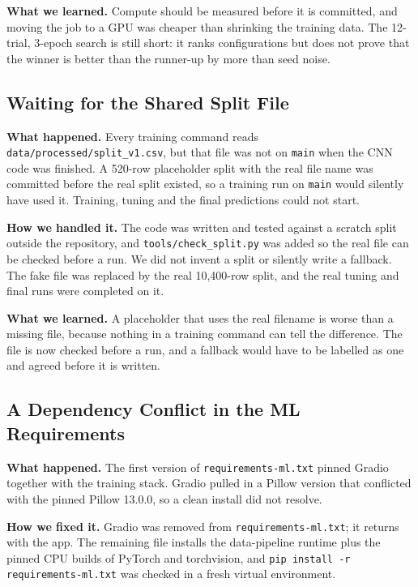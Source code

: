 \textbf{What we learned.} Compute should be measured before it is committed, and moving the job to a GPU was cheaper than shrinking the training data. The 12-trial, 3-epoch search is still short: it ranks configurations but does not prove that the winner is better than the runner-up by more than seed noise.

\subsection{Waiting for the Shared Split File}
\label{sec:challenge-split}

\textbf{What happened.} Every training command reads \texttt{data/processed/split\_v1.csv}, but that file was not on \texttt{main} when the CNN code was finished. A 520-row placeholder split with the real file name was committed before the real split existed, so a training run on \texttt{main} would silently have used it. Training, tuning and the final predictions could not start.

\textbf{How we handled it.} The code was written and tested against a scratch split outside the repository, and \texttt{tools/check\_split.py} was added so the real file can be checked before a run. We did not invent a split or silently write a fallback. The fake file was replaced by the real 10{,}400-row split, and the real tuning and final runs were completed on it.

\textbf{What we learned.} A placeholder that uses the real filename is worse than a missing file, because nothing in a training command can tell the difference. The file is now checked before a run, and a fallback would have to be labelled as one and agreed before it is written.

\subsection{A Dependency Conflict in the ML Requirements}
\label{sec:challenge-deps}

\textbf{What happened.} The first version of \texttt{requirements-ml.txt} pinned Gradio together with the training stack. Gradio pulled in a Pillow version that conflicted with the pinned Pillow 13.0.0, so a clean install did not resolve.

\textbf{How we fixed it.} Gradio was removed from \texttt{requirements-ml.txt}; it returns with the app. The remaining file installs the data-pipeline runtime plus the pinned CPU builds of PyTorch and torchvision, and \texttt{pip install -r requirements-ml.txt} was checked in a fresh virtual environment.


